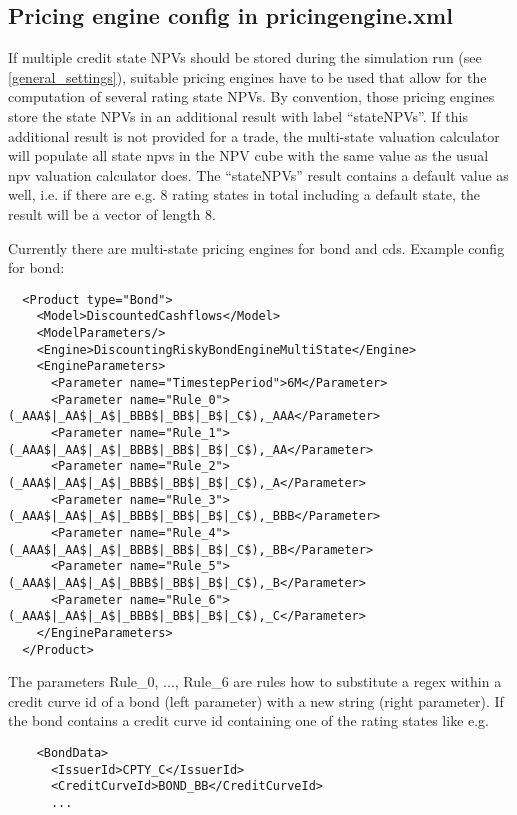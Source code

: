 \documentclass[12pt, a4paper]{article}
\begin{document}
\subsection{Pricing engine config in pricingengine.xml}\label{pricing_engine_config}

If multiple credit state NPVs should be stored during the simulation run (see \ref{general_settings}), suitable pricing
engines have to be used that allow for the computation of several rating state NPVs. By convention, those pricing
engines store the state NPVs in an additional result with label ``stateNPVs''. If this additional result is not provided
for a trade, the multi-state valuation calculator will populate all state npvs in the NPV cube with the same value as
the usual npv valuation calculator does. The ``stateNPVs'' result contains a default value as well, i.e. if there are
e.g. $8$ rating states in total including a default state, the result will be a vector of length 8.

Currently there are multi-state pricing engines for bond and cds. Example config for bond:

\begin{verbatim}
  <Product type="Bond">
    <Model>DiscountedCashflows</Model>
    <ModelParameters/>
    <Engine>DiscountingRiskyBondEngineMultiState</Engine>
    <EngineParameters>
      <Parameter name="TimestepPeriod">6M</Parameter>
      <Parameter name="Rule_0">(_AAA$|_AA$|_A$|_BBB$|_BB$|_B$|_C$),_AAA</Parameter>
      <Parameter name="Rule_1">(_AAA$|_AA$|_A$|_BBB$|_BB$|_B$|_C$),_AA</Parameter>
      <Parameter name="Rule_2">(_AAA$|_AA$|_A$|_BBB$|_BB$|_B$|_C$),_A</Parameter>
      <Parameter name="Rule_3">(_AAA$|_AA$|_A$|_BBB$|_BB$|_B$|_C$),_BBB</Parameter>
      <Parameter name="Rule_4">(_AAA$|_AA$|_A$|_BBB$|_BB$|_B$|_C$),_BB</Parameter>
      <Parameter name="Rule_5">(_AAA$|_AA$|_A$|_BBB$|_BB$|_B$|_C$),_B</Parameter>
      <Parameter name="Rule_6">(_AAA$|_AA$|_A$|_BBB$|_BB$|_B$|_C$),_C</Parameter>
    </EngineParameters>
  </Product>
\end{verbatim}

The parameters Rule\_0, ..., Rule\_6 are rules how to substitute a regex within a credit curve id of a bond (left
parameter) with a new string (right parameter). If the bond contains a credit curve id containing one of the rating
states like e.g.

\begin{verbatim}
    <BondData>
      <IssuerId>CPTY_C</IssuerId>
      <CreditCurveId>BOND_BB</CreditCurveId>
      ...
\end{verbatim}
\end{document}
